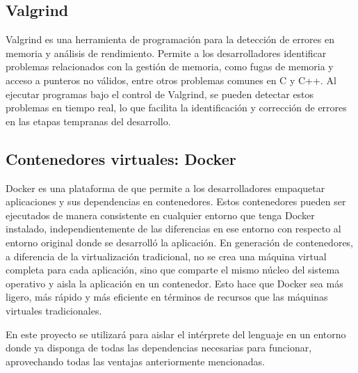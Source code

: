 \subsection{Valgrind}
Valgrind es una herramienta de programación para la detección de errores en memoria y análisis de rendimiento. Permite a los desarrolladores identificar problemas relacionados con la gestión de memoria, como fugas de memoria y acceso a punteros no válidos, entre otros problemas comunes en C y C++. Al ejecutar programas bajo el control de Valgrind, se pueden detectar estos problemas en tiempo real, lo que facilita la identificación y corrección de errores en las etapas tempranas del desarrollo.

\subsection{Contenedores virtuales: Docker}
Docker es una plataforma de que permite a los desarrolladores empaquetar aplicaciones y sus dependencias en contenedores. Estos contenedores pueden ser ejecutados de manera consistente en cualquier entorno que tenga Docker instalado, independientemente de las diferencias en ese entorno con respecto al entorno original donde se desarrolló la aplicación. En generación de contenedores, a diferencia de la virtualización tradicional, no se crea una máquina virtual completa para cada aplicación, sino que comparte el mismo núcleo del sistema operativo y aisla la aplicación en un contenedor. Esto hace que Docker sea más ligero, más rápido y más eficiente en términos de recursos que las máquinas virtuales tradicionales.

\vspace{0.5cm}
En este proyecto se utilizará para aislar el intérprete del lenguaje en un entorno donde ya disponga de todas las dependencias necesarias para funcionar, aprovechando todas las ventajas anteriormente mencionadas.

